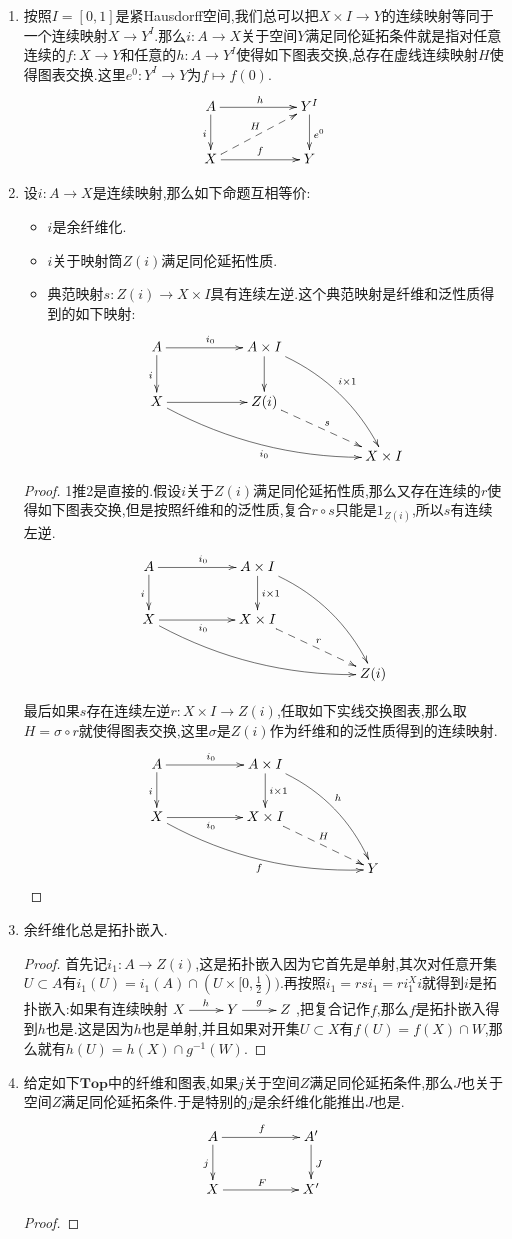 \begin{enumerate}
    \item 按照$I=[0,1]$是紧Hausdorff空间,我们总可以把$X\times I\to Y$的连续映射等同于一个连续映射$X\to Y^I$.那么$i:A\to X$关于空间$Y$满足同伦延拓条件就是指对任意连续的$f:X\to Y$和任意的$h:A\to Y^I$使得如下图表交换,总存在虚线连续映射$H$使得图表交换.这里$e^0:Y^I\to Y$为$f\mapsto f(0)$.
    $$\xymatrix{A\ar[rr]^h\ar[d]_i&&Y^I\ar[d]^{e^0}\\X\ar[rr]^f\ar@{-->}[urr]^H&&Y}$$
    \item 设$i:A\to X$是连续映射,那么如下命题互相等价:
    \begin{itemize}
    	\item $i$是余纤维化.
    	\item $i$关于映射筒$Z(i)$满足同伦延拓性质.
    	\item 典范映射$s:Z(i)\to X\times I$具有连续左逆.这个典范映射是纤维和泛性质得到的如下映射:
    	$$\xymatrix{A\ar[rr]^{i_0}\ar[d]_i&&A\times I\ar[d]\ar@/^1pc/[ddrr]^{i\times1}&&\\X\ar[rr]\ar@/_1pc/[drrrr]_{i_0}&&Z(i)\ar@{-->}[drr]^s&&\\&&&&X\times I}$$
    \end{itemize}
    \begin{proof}
    	
    	1推2是直接的.假设$i$关于$Z(i)$满足同伦延拓性质,那么又存在连续的$r$使得如下图表交换,但是按照纤维和的泛性质,复合$r\circ s$只能是$1_{Z(i)}$,所以$s$有连续左逆.
    	$$\xymatrix{A\ar[rr]^{i_0}\ar[d]_i&&A\times I\ar[d]^{i\times1}\ar@/^1pc/[ddrr]&&\\X\ar[rr]_{i_0}\ar@/_1pc/[drrrr]&&X\times I\ar@{-->}[drr]^r&&\\&&&&Z(i)}$$
    	
    	最后如果$s$存在连续左逆$r:X\times I\to Z(i)$,任取如下实线交换图表,那么取$H=\sigma\circ r$就使得图表交换,这里$\sigma$是$Z(i)$作为纤维和的泛性质得到的连续映射.
    	$$\xymatrix{A\ar[rr]^{i_0}\ar[d]_i&&A\times I\ar[d]^{i\times1}\ar@/^1pc/[ddrr]^h&&\\X\ar[rr]_{i_0}\ar@/_1pc/[drrrr]_f&&X\times I\ar@{-->}[drr]^H&&\\&&&&Y}$$
    \end{proof}
    \item 余纤维化总是拓扑嵌入.
    \begin{proof}
    	
    	首先记$i_1:A\to Z(i)$,这是拓扑嵌入因为它首先是单射,其次对任意开集$U\subset A$有$i_1(U)=i_1(A)\cap(U\times[0,\frac{1}{2}))$.再按照$i_1=rsi_1=ri_1^Xi$就得到$i$是拓扑嵌入:如果有连续映射$\xymatrix{X\ar[r]^h&Y\ar[r]^g&Z}$,把复合记作$f$,那么$f$是拓扑嵌入得到$h$也是.这是因为$h$也是单射,并且如果对开集$U\subset X$有$f(U)=f(X)\cap W$,那么就有$h(U)=h(X)\cap g^{-1}(W)$.
    \end{proof}
    \item 给定如下$\textbf{Top}$中的纤维和图表,如果$j$关于空间$Z$满足同伦延拓条件,那么$J$也关于空间$Z$满足同伦延拓条件.于是特别的$j$是余纤维化能推出$J$也是.
    $$\xymatrix{A\ar[rr]^f\ar[d]_j&&A'\ar[d]^{J}\\X\ar[rr]^F&&X'}$$
    \begin{proof}
    	

\end{proof}
\end{enumerate}
